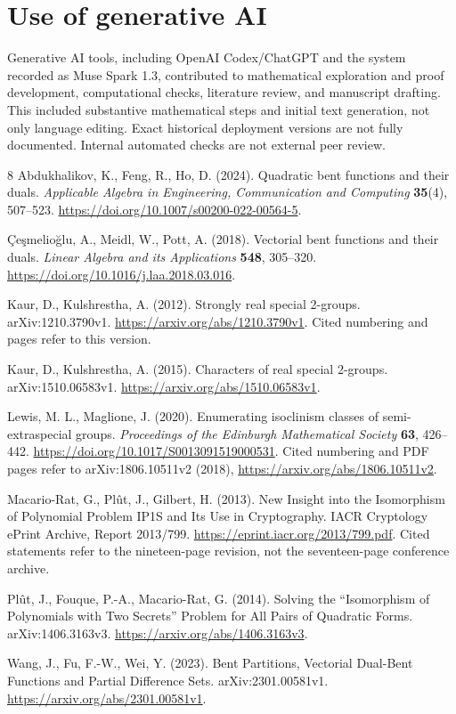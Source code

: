 \documentclass[11pt,a4paper]{article}
\theoremstyle{definition}
\theoremstyle{remark}
\numberwithin{equation}{section}
\begin{document}
\section*{Use of generative AI}
Generative AI tools, including OpenAI Codex/ChatGPT and the system
recorded as Muse Spark 1.3, contributed to mathematical exploration
and proof development, computational checks, literature review, and
manuscript drafting. This included substantive mathematical steps and
initial text generation, not only language editing. Exact historical
deployment versions are not fully documented. Internal automated checks
are not external peer review.

\begingroup
\raggedright
\begin{thebibliography}{8}
Abdukhalikov, K., Feng, R., Ho, D. (2024).
Quadratic bent functions and their duals.
\emph{Applicable Algebra in Engineering, Communication and Computing}
\textbf{35}(4), 507--523.
\url{https://doi.org/10.1007/s00200-022-00564-5}.

\c{C}e\c{s}melio\u{g}lu, A., Meidl, W., Pott, A. (2018).
Vectorial bent functions and their duals.
\emph{Linear Algebra and its Applications} \textbf{548}, 305--320.
\url{https://doi.org/10.1016/j.laa.2018.03.016}.

Kaur, D., Kulshrestha, A. (2012). Strongly real special 2-groups.
arXiv:1210.3790v1.
\url{https://arxiv.org/abs/1210.3790v1}.
Cited numbering and pages refer to this version.

Kaur, D., Kulshrestha, A. (2015). Characters of real special 2-groups.
arXiv:1510.06583v1.
\url{https://arxiv.org/abs/1510.06583v1}.

Lewis, M. L., Maglione, J. (2020).
Enumerating isoclinism classes of semi-extraspecial groups.
\emph{Proceedings of the Edinburgh Mathematical Society}
\textbf{63}, 426--442.
\url{https://doi.org/10.1017/S0013091519000531}.
Cited numbering and PDF pages refer to arXiv:1806.10511v2 (2018),
\url{https://arxiv.org/abs/1806.10511v2}.

Macario-Rat, G., Pl\^ut, J., Gilbert, H. (2013).
New Insight into the Isomorphism of Polynomial Problem IP1S and Its
Use in Cryptography. IACR Cryptology ePrint Archive, Report 2013/799.
\url{https://eprint.iacr.org/2013/799.pdf}.
Cited statements refer to the nineteen-page revision,
not the seventeen-page conference archive.

Pl\^ut, J., Fouque, P.-A., Macario-Rat, G. (2014).
Solving the ``Isomorphism of Polynomials with Two Secrets'' Problem
for All Pairs of Quadratic Forms. arXiv:1406.3163v3.
\url{https://arxiv.org/abs/1406.3163v3}.

Wang, J., Fu, F.-W., Wei, Y. (2023).
Bent Partitions, Vectorial Dual-Bent Functions and Partial Difference
Sets. arXiv:2301.00581v1.
\url{https://arxiv.org/abs/2301.00581v1}.
\end{thebibliography}
\endgroup
\end{document}
